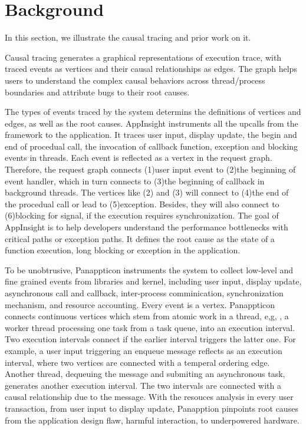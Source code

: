 \section{Background} \label{sec:background}

In this section, we illustrate the causal tracing and prior work on it.

Causal tracing generates a graphical representations of execution trace, with
traced events as vertices and their causal relationships as edges. The graph
helps users to understand the complex causal behaviors across thread/process
boundaries and attribute bugs to their root causes.

The types of events traced by the system determins the definitions of vertices
and edges, as well as the root causes. AppInsight instruments all the upcalls
from the framework to the application. It traces user input, display update,
the begin and end of procedual call, the invocation of callback function,
exception and blocking events in threads. Each event is reflected as a vertex
in the request graph. Therefore, the request graph connects (1)user input
event to (2)the beginning of event handler, which in turn connects to (3)the
beginning of callback in background threads. The vertices like (2) and (3) will
connect to (4)the end of the procedual call or lead to (5)exception. Besides,
they will also connect to (6)blocking for signal, if the execution requires
synchronization. The goal of AppInsight is to help developers understand the
performance bottlenecks with critical paths or exception paths. It defines the
root cause as the state of a function execution, long blocking or exception in
the application.

To be unobtrusive, Panappticon instruments the system to collect low-level and
fine grained events from libraries and kernel, including user input, display
update, asynchronous call and callback, inter-process comminication,
synchronization mechanism, and resource accounting. Every event is a vertex.
Panappticon connects continuous vertices which stem from atomic work in a
thread, e,g, , a worker thread processing one task from a task queue, into an
execution interval. Two execution intervals connect if the earlier interval
triggers the latter one. For example, a user input triggering an enqueue
message reflects as an execution interval, where two vertices are connected
with a temperal ordering edge. Another thread, dequeuing the message and
submiting an asynchronous task, generates another execution interval. The two
intervals are connected with a causal relationship due to the message. With the
resouces analysis in every user transaction, from user input to display update,
Panapption pinpoints root causes from the application design flaw, harmful
interaction, to underpowered hardware.
